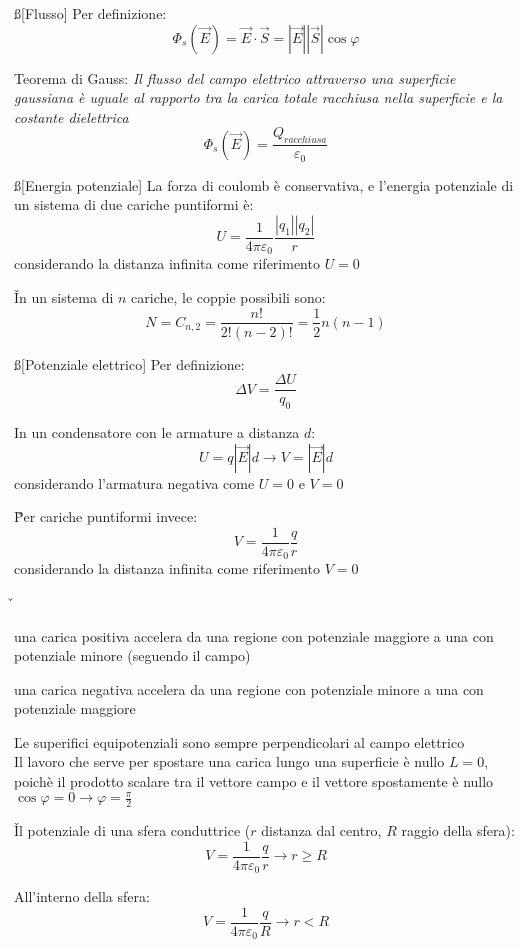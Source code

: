 \documentclass[12pt]{article}
\begin{document}
\ss[Flusso]
Per definizione:
$$ \Phi_s(\vec{E}) = \vec{E} \cdot \vec{S} = |\vec{E}||\vec{S}|\cos{\varphi} $$

Teorema di Gauss: \textit{Il flusso del campo elettrico attraverso una superficie gaussiana è uguale al rapporto tra la carica totale racchiusa nella superficie e la costante dielettrica}
$$ \Phi_s(\vec{E}) = \frac{Q_{racchiusa}}{\varepsilon_0} $$

\ss[Energia potenziale]
La forza di coulomb è conservativa, e l'energia potenziale di un sistema di due cariche puntiformi è:
$$ U = \frac{1}{4\pi\varepsilon_0}\frac{|q_1||q_2|}{r} $$
considerando la distanza infinita come riferimento $U=0$

\v

In un sistema di $n$ cariche, le coppie possibili sono:
$$ N = C_{n,2} = \frac{n!}{2!(n-2)!} = \frac{1}{2}n(n-1) $$

\ss[Potenziale elettrico]
Per definizione:
$$ \Delta V = \frac{\Delta U}{q_0} $$

In un condensatore con le armature a distanza $d$:
$$ U = q|\vec{E}|d \longrightarrow V = |\vec{E}|d $$
considerando l'armatura negativa come $U=0$ e $V=0$

\v

Per cariche puntiformi invece:
$$ V = \frac{1}{4\pi\varepsilon_0}\frac{q}{r} $$
considerando la distanza infinita come riferimento $V=0$

\v

\bi
    \item una carica positiva accelera da una regione con potenziale maggiore a una con potenziale minore (seguendo il campo)
    \item una carica negativa accelera da una regione con potenziale minore a una con potenziale maggiore
\ei

\v

Le superifici equipotenziali sono sempre perpendicolari al campo elettrico \\
Il lavoro che serve per spostare una carica lungo una superficie è nullo $L = 0$, poichè il prodotto scalare tra il vettore campo e il vettore spostamente è nullo $\cos{\varphi} = 0 \rightarrow \varphi = \frac{\pi}{2}$

\v

Il potenziale di una sfera conduttrice ($r$ distanza dal centro, $R$ raggio della sfera):
$$ V = \frac{1}{4\pi\varepsilon_0}\frac{q}{r} \longrightarrow r \ge R $$

All'interno della sfera:
$$ V = \frac{1}{4\pi\varepsilon_0}\frac{q}{R} \longrightarrow r < R $$
\end{document}
